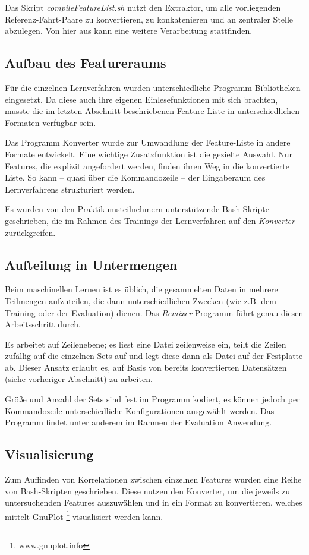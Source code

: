 Das Skript \textit{compileFeatureList.sh} nutzt den Extraktor, um alle vorliegenden Referenz-Fahrt-Paare zu konvertieren, zu konkatenieren und an zentraler Stelle abzulegen. Von hier aus kann eine weitere Verarbeitung stattfinden.

\subsection{Aufbau des Featureraums}
\label{subsec:AufbauDesFeatureraums}
Für die einzelnen Lernverfahren wurden unterschiedliche Programm-Bibliotheken eingesetzt. Da diese auch ihre eigenen Einlesefunktionen mit sich brachten, musste die im letzten Abschnitt beschriebenen Feature-Liste in unterschiedlichen Formaten verfügbar sein.

Das Programm Konverter wurde zur Umwandlung der Feature-Liste in andere Formate entwickelt. Eine wichtige Zusatzfunktion ist die gezielte Auswahl. Nur Features, die explizit angefordert werden, finden ihren Weg in die konvertierte Liste. So kann – quasi über die Kommandozeile – der Eingaberaum des Lernverfahrens strukturiert werden.

Es wurden von den Praktikumsteilnehmern unterstützende Bash-Skripte geschrieben, die im Rahmen des Trainings der Lernverfahren auf den \textit{Konverter} zurückgreifen.

\subsection{Aufteilung in Untermengen}
\label{subsec:AufteilungInUntermengen}
Beim maschinellen Lernen ist es üblich, die gesammelten Daten in mehrere Teilmengen aufzuteilen, die dann unterschiedlichen Zwecken (wie z.B. dem Training oder der Evaluation) dienen. Das \textit{Remixer}-Programm führt genau diesen Arbeitsschritt durch.

Es arbeitet auf Zeilenebene; es liest eine Datei zeilenweise ein, teilt die Zeilen zufällig auf die einzelnen Sets auf und legt diese dann als Datei auf der Festplatte ab. Dieser Ansatz erlaubt es, auf Basis von bereits konvertierten Datensätzen (siehe vorheriger Abschnitt) zu arbeiten.

Größe und Anzahl der Sets sind fest im Programm kodiert, es können jedoch per Kommandozeile unterschiedliche Konfigurationen ausgewählt werden. Das Programm findet unter anderem im Rahmen der Evaluation Anwendung.

\subsection{Visualisierung}
\label{subsec:Visualisierung}
Zum Auffinden von Korrelationen zwischen einzelnen Features wurden eine Reihe von Bash-Skripten geschrieben. Diese nutzen den Konverter, um die jeweils zu untersuchenden Features auszuwählen und in ein Format zu konvertieren, welches mittelt GnuPlot \footnote{www.gnuplot.info} visualisiert werden kann.


